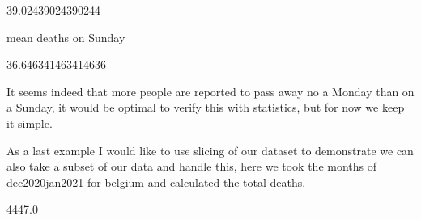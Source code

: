 \documentclass[letterpaper,10pt,english]{jupyterBook}
\begin{document}
\begin{sphinxVerbatim}[commandchars=\\\{\}]
39.02439024390244
\end{sphinxVerbatim}

\begin{sphinxVerbatim}[commandchars=\\\{\}]
\PYG{p}{[}\PYG{p}{]}
\end{sphinxVerbatim}

\begin{sphinxVerbatim}[commandchars=\\\{\}]
mean deaths on Sunday
\end{sphinxVerbatim}

\begin{sphinxVerbatim}[commandchars=\\\{\}]
36.646341463414636
\end{sphinxVerbatim}

\sphinxAtStartPar
It seems indeed that more people are reported to pass away no a Monday than on a Sunday, it would be optimal to verify this with statistics, but for now we keep it simple.

\sphinxAtStartPar
As a last example I would like to use slicing of our dataset to demonstrate we can also take a subset of our data and handle this, here we took the months of dec2020\sphinxhyphen{}jan2021 for belgium and calculated the total deaths.

\begin{sphinxVerbatim}[commandchars=\\\{\}]
\PYG{p}{[}\PYG{p}{]}
\end{sphinxVerbatim}

\begin{sphinxVerbatim}[commandchars=\\\{\}]
4447.0
\end{sphinxVerbatim}
\end{document}
